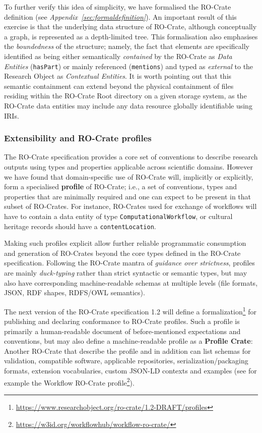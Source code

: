 \documentclass[ds,v1.1.2,openaccess]{iosart2x}%
\begin{document}
To further verify this idea of simplicity, we have formalised the
RO-Crate definition (see \textit{Appendix~\ref{sec:formaldefinition}}). An
important result of this exercise is that the underlying data structure
of RO-Crate, although conceptually a graph, is represented as a
depth-limited tree. This formalisation also emphasises the
\textit{boundedness} of the structure; namely, the fact that elements are
specifically identified as being either semantically \textit{contained} by the
RO-Crate as \textit{Data Entities} (\texttt{hasPart}) or mainly referenced
(\texttt{mentions}) and typed as \textit{external} to the Research Object as
\textit{Contextual Entities}. It is worth pointing out that this semantic
containment can extend beyond the physical containment of files
residing within the RO-Crate Root directory on a given storage system,
as the RO-Crate data entities may include any data resource globally
identifiable using IRIs.
\subsubsection{Extensibility and RO-Crate profiles}%

\label{sec:profiles}

The RO-Crate specification provides a core set of conventions to
describe research outputs using types and properties applicable across
scientific domains. However we have found that domain-specific use of
RO-Crate will, implicitly or explicitly, form a specialised \textbf{profile}
of RO-Crate; i.e., {a set of conventions, types and properties that are
minimally required and one can expect to be present in that subset of
RO-Crates}. For instance, RO-Crates used for exchange of workflows will
have to contain a data entity of type \texttt{ComputationalWorkflow}, or
cultural heritage records should have a \texttt{contentLocation}.

Making such profiles explicit allow further reliable programmatic
consumption and generation of RO-Crates beyond the core types defined
in the RO-Crate specification. Following the RO-Crate mantra of
\textit{guidance over strictness}, profiles are mainly \textit{duck-typing} rather
than strict syntactic or semantic types, but may also have
corresponding machine-readable schemas at multiple levels (file
formats, JSON, RDF shapes, RDFS/OWL semantics).

The next version of the RO-Crate specification 1.2 will define a
formalization\footnote{\url{https://www.researchobject.org/ro-crate/1.2-DRAFT/profiles}}
for publishing and declaring conformance to RO-Crate profiles. Such a
profile is primarily a human-readable document of before-mentioned
expectations and conventions, but may also define a machine-readable
profile as a \textbf{Profile Crate}: Another RO-Crate that describe the
profile and in addition can list schemas for validation, compatible
software, applicable repositories, serialization/packaging formats,
extension vocabularies, custom JSON-LD contexts and examples (see for
example the Workflow RO-Crate
profile\footnote{\url{https://w3id.org/workflowhub/workflow-ro-crate/}}).
\end{document}
